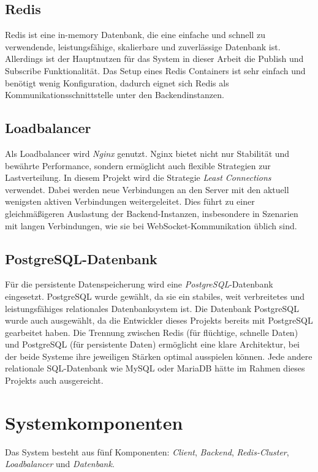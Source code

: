 \subsection{Redis}
Redis ist eine in-memory Datenbank, die eine einfache und schnell zu verwendende, leistungsfähige, skalierbare und zuverlässige Datenbank ist.
Allerdings ist der Hauptnutzen für das System in dieser Arbeit die Publish und Subscribe Funktionalität.
Das Setup eines Redis Containers ist sehr einfach und benötigt wenig Konfiguration, dadurch eignet sich Redis als Kommunikationsschnittstelle unter den Backendinstanzen.

\subsection{Loadbalancer}
Als Loadbalancer wird \textit{Nginx} genutzt. 
Nginx bietet nicht nur Stabilität und bewährte Performance, sondern ermöglicht auch flexible Strategien 
zur Lastverteilung.  
In diesem Projekt wird die Strategie \textit{Least Connections} verwendet. Dabei werden neue Verbindungen 
an den Server mit den aktuell wenigsten aktiven Verbindungen weitergeleitet.  
Dies führt zu einer gleichmäßigeren Auslastung der Backend-Instanzen, insbesondere in Szenarien mit 
langen Verbindungen, wie sie bei WebSocket-Kommunikation üblich sind.

\subsection{PostgreSQL-Datenbank}
Für die persistente Datenspeicherung wird eine \textit{PostgreSQL}-Datenbank eingesetzt.  
PostgreSQL wurde gewählt, da sie ein stabiles, weit verbreitetes und leistungsfähiges relationales Datenbanksystem ist. 
Die Datenbank PostgreSQL wurde auch ausgewählt, da die Entwickler dieses Projekts bereits mit PostgreSQL gearbeitet haben.
Die Trennung zwischen Redis (für flüchtige, schnelle Daten) und PostgreSQL (für persistente Daten) 
ermöglicht eine klare Architektur, bei der beide Systeme ihre jeweiligen Stärken optimal ausspielen können.
Jede andere relationale SQL-Datenbank wie MySQL oder MariaDB hätte im Rahmen dieses Projekts auch ausgereicht.

\section{Systemkomponenten}
Das System besteht aus fünf Komponenten: \textit{Client}, \textit{Backend}, \textit{Redis-Cluster}, \textit{Loadbalancer} und \textit{Datenbank}.

